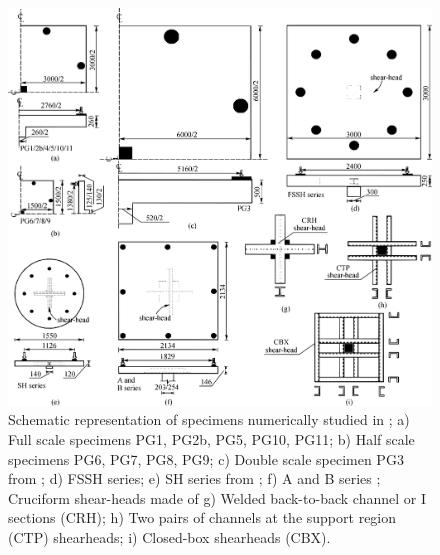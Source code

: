 \documentclass[twocolumn]{article} %
\begin{document}
\begin{figure}\centering
    \includegraphics[width=\columnwidth]{Figures/b2020f2.pdf}
    \caption{Schematic representation of specimens numerically studied in \cite{bompa2020}; a) Full scale specimens PG1, PG2b, PG5, PG10, PG11; b) Half scale specimens PG6, PG7, PG8, PG9; c) Double scale specimen PG3 from \cite{guandalini2009punching}; d) FSSH series; e) SH series from \cite{chana1996}; f) A and B series \citep{hawkins1974}; Cruciform shear-heads made of g) Welded back-to-back channel or I sections (CRH); h) Two pairs of channels at the support region (CTP) shearheads; i) Closed-box shearheads (CBX).}
    \label{b2020f2}
    \end{figure}
\end{document}
